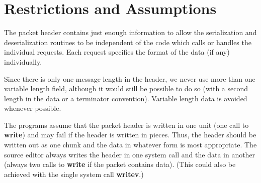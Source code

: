 \section{Restrictions and Assumptions}

The packet header contains just enough information to allow the serialization
and deserialization routines to be independent of the code which calls
or handles the individual requests.  Each request specifies the format of
the data (if any) individually.

Since there is only one message length in the header, we never use more
than one variable length field, although it would still be possible to
do so (with a second length in the data or a terminator convention).
Variable length data is avoided whenever possible.

The programs assume that the packet header is written in one unit (one
call to {\bf write}) and may fail if the header is written in pieces.
Thus, the header should be written out as one chunk and the data in
whatever form is most appropriate.  The source editor always writes the
header in one system call and the data in another (always two calls
to {\bf write} if the packet contains data).  (This could also be achieved
with the single system call {\bf writev}.)
